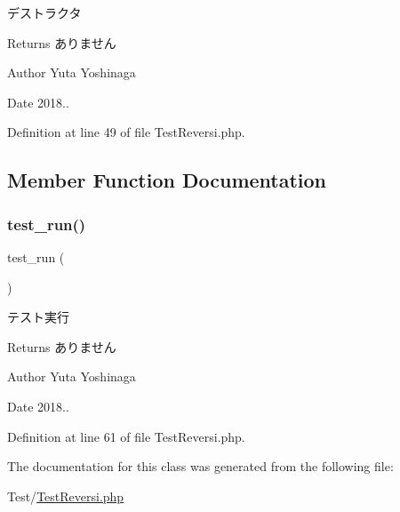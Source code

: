 デストラクタ 

\begin{DoxyReturn}{Returns}
ありません 
\end{DoxyReturn}
\begin{DoxyAuthor}{Author}
Yuta Yoshinaga 
\end{DoxyAuthor}
\begin{DoxyDate}{Date}
2018.. 
\end{DoxyDate}


Definition at line 49 of file Test\+Reversi.\+php.



\subsection{Member Function Documentation}
\mbox{\label{class_test_reversi_a9b029832cfdf19c0ef36b1f5ef7b7735}} 
\subsubsection{\texorpdfstring{test\+\_\+run()}{test\_run()}}
{\footnotesize\ttfamily test\+\_\+run (\begin{DoxyParamCaption}{ }\end{DoxyParamCaption})}



テスト実行 

\begin{DoxyReturn}{Returns}
ありません 
\end{DoxyReturn}
\begin{DoxyAuthor}{Author}
Yuta Yoshinaga 
\end{DoxyAuthor}
\begin{DoxyDate}{Date}
2018.. 
\end{DoxyDate}


Definition at line 61 of file Test\+Reversi.\+php.



The documentation for this class was generated from the following file\+:\begin{DoxyCompactItemize}
\item 
Test/\hyperlink{_test_reversi_8php}{Test\+Reversi.\+php}\end{DoxyCompactItemize}
